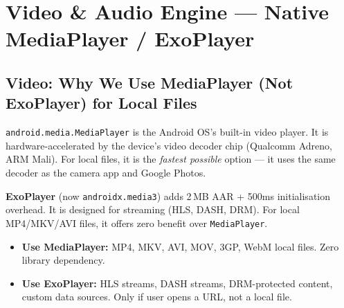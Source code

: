 \documentclass[12pt,a4paper]{report}
\newcommand{\PB}{\newpage}
\begin{document}
\PB

\chapter{Video \& Audio Engine — Native MediaPlayer / ExoPlayer}

\section{Video: Why We Use MediaPlayer (Not ExoPlayer) for Local Files}

\texttt{android.media.MediaPlayer} is the Android OS's built-in video player.
It is hardware-accelerated by the device's video decoder chip (Qualcomm Adreno,
ARM Mali). For local files, it is the \emph{fastest possible} option — it uses
the same decoder as the camera app and Google Photos.

\textbf{ExoPlayer} (now \texttt{androidx.media3}) adds 2\,MB AAR + 500ms
initialisation overhead. It is designed for streaming (HLS, DASH, DRM). For
local MP4/MKV/AVI files, it offers zero benefit over \texttt{MediaPlayer}.

\begin{wbox}
\begin{itemize}[leftmargin=1.4em,topsep=2pt,itemsep=3pt]
\item \textbf{Use MediaPlayer:} MP4, MKV, AVI, MOV, 3GP, WebM local files.
  Zero library dependency.
\item \textbf{Use ExoPlayer:} HLS streams, DASH streams, DRM-protected content,
  custom data sources. Only if user opens a URL, not a local file.
\end{itemize}
\end{wbox}
\end{document}
